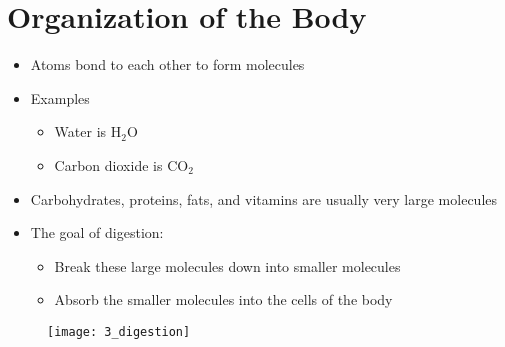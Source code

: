 \documentclass[title={Chapter 3}]{fdsn201notes}
\begin{document}
\maketitle
\setcounter{chapter}{3}

\section{Organization of the Body}\label{sec:organization-of-the-body}
\begin{itemize}
	\item Atoms bond to each other to form molecules
\end{itemize}
\begin{itemize}
	\item Examples
	\begin{itemize}
		\item Water is $\mbox{H}_{2}\mbox{O}$
		\item Carbon dioxide is $\mbox{CO}_{2}$
	\end{itemize}
	\item Carbohydrates, proteins, fats, and vitamins are usually very large molecules
	\item The goal of digestion:
	\begin{itemize}
		\item Break these large molecules down into smaller molecules
		\item Absorb the smaller molecules into the cells of the body
	\end{itemize}
\end{itemize}

\begin{figure}[H]
	\centering
	\texttt{[image: 3\_digestion]}
	\caption{}
	\label{fig:3_digestion}
\end{figure}
\end{document}

